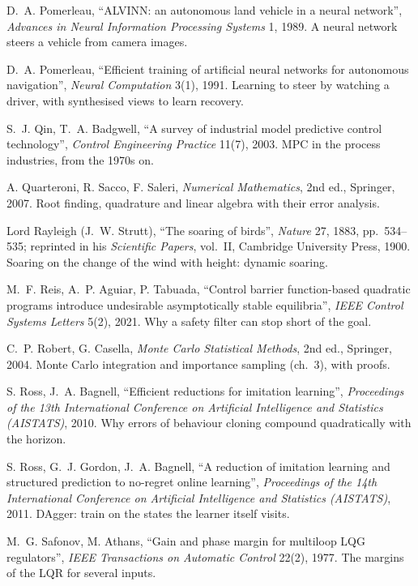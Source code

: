 \begin{description}[leftmargin=1.5em, itemindent=-1.5em, itemsep=5pt, font=\normalfont]
  \item[] D.~A. Pomerleau, \enquote{ALVINN: an autonomous land vehicle in a neural network}, \emph{Advances in Neural Information Processing Systems} 1, 1989. A neural network steers a vehicle from camera images.
  \item[] D.~A. Pomerleau, \enquote{Efficient training of artificial neural networks for autonomous navigation}, \emph{Neural Computation} 3(1), 1991. Learning to steer by watching a driver, with synthesised views to learn recovery.
  \item[] S.~J. Qin, T.~A. Badgwell, \enquote{A survey of industrial model predictive control technology}, \emph{Control Engineering Practice} 11(7), 2003. MPC in the process industries, from the 1970s on.
  \item[] A. Quarteroni, R. Sacco, F. Saleri, \emph{Numerical Mathematics}, 2nd ed., Springer, 2007. Root finding, quadrature and linear algebra with their error analysis.
  \item[] Lord Rayleigh (J.~W. Strutt), \enquote{The soaring of birds}, \emph{Nature} 27, 1883, pp.~534--535; reprinted in his \emph{Scientific Papers}, vol.~II, Cambridge University Press, 1900. Soaring on the change of the wind with height: dynamic soaring.
  \item[] M.~F. Reis, A.~P. Aguiar, P. Tabuada, \enquote{Control barrier function-based quadratic programs introduce undesirable asymptotically stable equilibria}, \emph{IEEE Control Systems Letters} 5(2), 2021. Why a safety filter can stop short of the goal.
  \item[] C.~P. Robert, G. Casella, \emph{Monte Carlo Statistical Methods}, 2nd ed., Springer, 2004. Monte Carlo integration and importance sampling (ch.~3), with proofs.
  \item[] S. Ross, J.~A. Bagnell, \enquote{Efficient reductions for imitation learning}, \emph{Proceedings of the 13th International Conference on Artificial Intelligence and Statistics (AISTATS)}, 2010. Why errors of behaviour cloning compound quadratically with the horizon.
  \item[] S. Ross, G.~J. Gordon, J.~A. Bagnell, \enquote{A reduction of imitation learning and structured prediction to no-regret online learning}, \emph{Proceedings of the 14th International Conference on Artificial Intelligence and Statistics (AISTATS)}, 2011. DAgger: train on the states the learner itself visits.
  \item[] M.~G. Safonov, M. Athans, \enquote{Gain and phase margin for multiloop LQG regulators}, \emph{IEEE Transactions on Automatic Control} 22(2), 1977. The margins of the LQR for several inputs.

\end{description}
